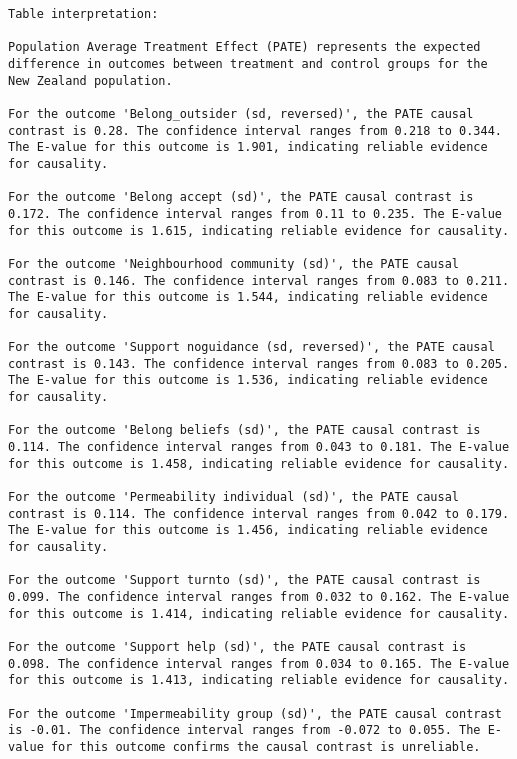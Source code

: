 \documentclass[
  singlecolumn]{report}
\begin{document}
\begin{verbatim}
Table interpretation:

Population Average Treatment Effect (PATE) represents the expected difference in outcomes between treatment and control groups for the New Zealand population.

For the outcome 'Belong_outsider (sd, reversed)', the PATE causal contrast is 0.28. The confidence interval ranges from 0.218 to 0.344. The E-value for this outcome is 1.901, indicating reliable evidence for causality.

For the outcome 'Belong accept (sd)', the PATE causal contrast is 0.172. The confidence interval ranges from 0.11 to 0.235. The E-value for this outcome is 1.615, indicating reliable evidence for causality.

For the outcome 'Neighbourhood community (sd)', the PATE causal contrast is 0.146. The confidence interval ranges from 0.083 to 0.211. The E-value for this outcome is 1.544, indicating reliable evidence for causality.

For the outcome 'Support noguidance (sd, reversed)', the PATE causal contrast is 0.143. The confidence interval ranges from 0.083 to 0.205. The E-value for this outcome is 1.536, indicating reliable evidence for causality.

For the outcome 'Belong beliefs (sd)', the PATE causal contrast is 0.114. The confidence interval ranges from 0.043 to 0.181. The E-value for this outcome is 1.458, indicating reliable evidence for causality.

For the outcome 'Permeability individual (sd)', the PATE causal contrast is 0.114. The confidence interval ranges from 0.042 to 0.179. The E-value for this outcome is 1.456, indicating reliable evidence for causality.

For the outcome 'Support turnto (sd)', the PATE causal contrast is 0.099. The confidence interval ranges from 0.032 to 0.162. The E-value for this outcome is 1.414, indicating reliable evidence for causality.

For the outcome 'Support help (sd)', the PATE causal contrast is 0.098. The confidence interval ranges from 0.034 to 0.165. The E-value for this outcome is 1.413, indicating reliable evidence for causality.

For the outcome 'Impermeability group (sd)', the PATE causal contrast is -0.01. The confidence interval ranges from -0.072 to 0.055. The E-value for this outcome confirms the causal contrast is unreliable.
\end{verbatim}
\end{document}
